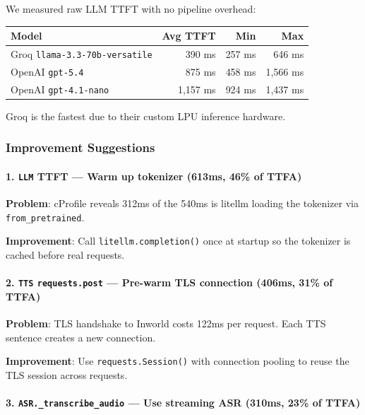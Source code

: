 We measured raw LLM TTFT with no pipeline overhead:

\begin{table}[h]
\centering
\begin{tabular}{|l|r|r|r|}
\hline
\textbf{Model} & \textbf{Avg TTFT} & \textbf{Min} & \textbf{Max} \\
\hline
Groq \texttt{llama-3.3-70b-versatile} & 390 ms & 257 ms & 646 ms \\
OpenAI \texttt{gpt-5.4} & 875 ms & 458 ms & 1,566 ms \\
OpenAI \texttt{gpt-4.1-nano} & 1,157 ms & 924 ms & 1,437 ms \\
\hline
\end{tabular}
\end{table}

Groq is the fastest due to their custom LPU inference hardware.

\subsubsection{Improvement Suggestions}

\paragraph{1. \texttt{LLM} TTFT --- Warm up tokenizer (613ms, 46\% of TTFA)}

\textbf{Problem}: cProfile reveals 312ms of the 540ms is litellm loading the tokenizer via \texttt{from\_pretrained}.

\textbf{Improvement}: Call \texttt{litellm.completion()} once at startup so the tokenizer is cached before real requests.

\paragraph{2. \texttt{TTS} \texttt{requests.post} --- Pre-warm TLS connection (406ms, 31\% of TTFA)}

\textbf{Problem}: TLS handshake to Inworld costs 122ms per request. Each TTS sentence creates a new connection.

\textbf{Improvement}: Use \texttt{requests.Session()} with connection pooling to reuse the TLS session across requests.

\paragraph{3. \texttt{ASR.\_transcribe\_audio} --- Use streaming ASR (310ms, 23\% of TTFA)}

